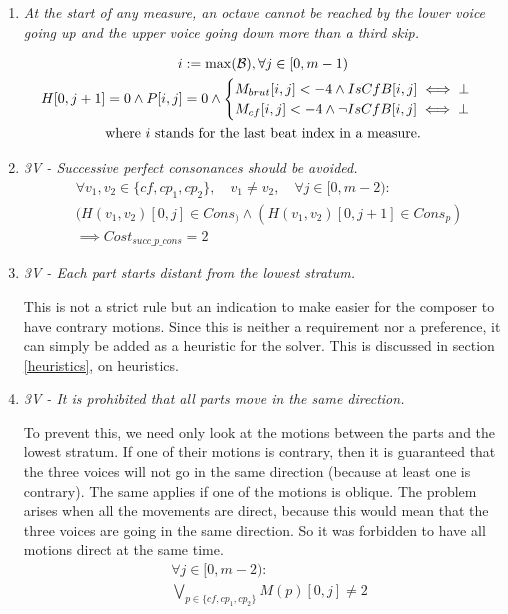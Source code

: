 \begin{enumerate}[wide, label=\bfseries 1.P\arabic*]
\item\label{rule:battuta}{ \textit{At the start of any measure, an octave cannot be reached by the lower voice going up and the upper voice going down more than a third skip.}}


\begin{equation}
    \begin{gathered}
        i := \max (\mathcal{B}), \forall j \in [0, m-1)\\
        H[0, j+1] = 0 \land P[i, j] = 0 \land \begin{cases}
            M_{brut}[i, j] < -4 \land IsCfB[i, j] \iff \bot\\
            M_{cf}[i, j] < -4 \land \lnot IsCfB[i, j] \iff \bot
        \end{cases}\\
        \text{where } i \text{ stands for the last beat index in a measure.}
    \end{gathered}
    \label{eq:battuta}
\end{equation}

\item \textit{3V - Successive perfect consonances should be avoided.}
\begin{equation} \begin{aligned}
    &\forall v_1, v_2 \in \{cf, cp_1, cp_2\}, \quad v_1 \neq v_2, \quad \forall j \in [0, m-2) \colon\\
    &(H(v_1,v_2)[0, j] \in Cons_) \land (H(v_1,v_2)[0, j+1] \in Cons_p)\\
    &\implies Cost_{succ\_p\_cons} = 2
    \end{aligned} \end{equation}

    \item  \textit{3V - Each part starts distant from the lowest stratum.}

    This is not a strict rule but an indication to make easier for the composer to have contrary motions. Since this is neither a requirement nor a preference, it can simply be added as a heuristic for the solver. This is discussed in section \ref{heuristics}, on heuristics.


    \item \textit{3V - It is prohibited that all parts move in the same direction.}

    To prevent this, we need only look at the motions between the parts and the lowest stratum. If one of their motions is contrary, then it is guaranteed that the three voices will not go in the same direction (because at least one is contrary). The same applies if one of the motions is oblique. The problem arises when all the movements are direct, because this would mean that the three voices are going in the same direction. So it was forbidden to have all motions direct at the same time.
    \begin{equation} \begin{aligned}
    &\forall j \in [0, m-2) \colon\\
    &\bigvee_{p \in \{cf, cp_1, cp_2\}}  M(p)[0, j] \neq 2
    \end{aligned} \end{equation}


\end{enumerate}
